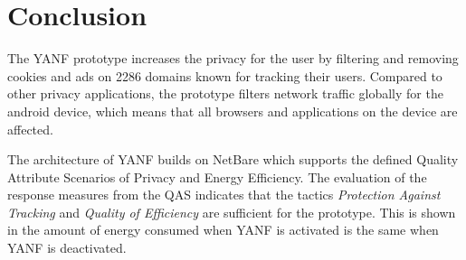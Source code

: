 \documentclass[main.tex]{subfiles}
\begin{document}
\section{Conclusion}
\label{sec:conclusion}







The YANF prototype increases the privacy for the user by filtering and removing cookies and ads on 2286 domains known for tracking their users. Compared to other privacy applications, the prototype filters network traffic globally for the android device, which means that all browsers and applications on the device are affected. 

The architecture of YANF builds on NetBare which supports the defined Quality Attribute Scenarios of Privacy and Energy Efficiency. The evaluation of the response measures from the QAS indicates that the tactics \textit{Protection Against Tracking} and \textit{Quality of Efficiency} are sufficient for the prototype. This is shown in the amount of energy consumed when YANF is activated is the same when YANF is deactivated.
\end{document}
